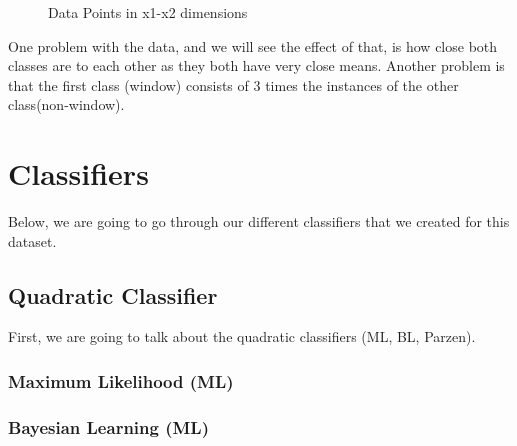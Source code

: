 \documentclass[11pt, oneside]{article}   	%
\begin{document}
\begin{figure}
\begin{center}
\end{center}
\caption{Data Points in x1-x2 dimensions}
\label{fig:data-points}
\end{figure}

One problem with the data, and we will see the effect of that, is how close both classes are to each other as they both have very close means. Another problem is that the first class (window) consists of 3 times the instances of the other class(non-window).

\section*{Classifiers}
Below, we are going to go through our different classifiers that we created for this dataset.

\subsection{Quadratic Classifier}
First, we are going to talk about the quadratic classifiers (ML, BL, Parzen).
\subsubsection*{Maximum Likelihood (ML)}
\subsubsection*{Bayesian Learning (ML)}
\end{document}
